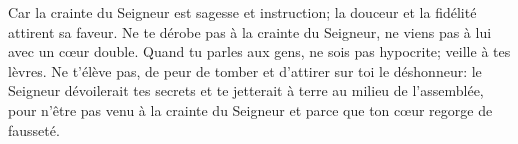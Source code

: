 Car la crainte du Seigneur est sagesse et instruction;
	la douceur et la fidélité attirent sa faveur.
Ne te dérobe pas à la crainte du Seigneur,
	ne viens pas à lui avec un cœur double.
	Quand tu parles aux gens, ne sois pas hypocrite; veille à tes lèvres.
Ne t’élève pas, de peur de tomber et d’attirer sur toi le déshonneur:
	le Seigneur dévoilerait tes secrets et te jetterait à terre au milieu de l’assemblée,
	pour n’être pas venu à la crainte du Seigneur
	et parce que ton cœur regorge de fausseté.
